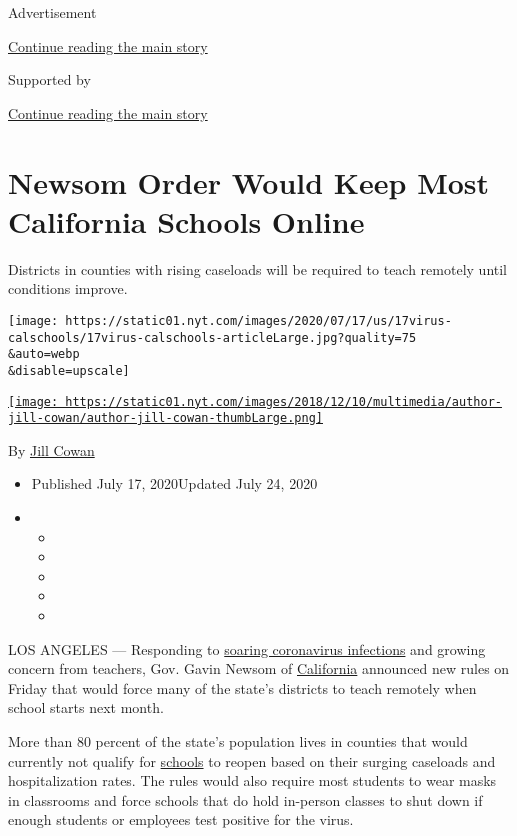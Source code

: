 Advertisement

\protect\hyperlink{after-top}{Continue reading the main story}

Supported by

\protect\hyperlink{after-sponsor}{Continue reading the main story}

\hypertarget{newsom-order-would-keep-most-california-schools-online}{%
\section{Newsom Order Would Keep Most California Schools
Online}\label{newsom-order-would-keep-most-california-schools-online}}

Districts in counties with rising caseloads will be required to teach
remotely until conditions improve.

\texttt{[image: https://static01.nyt.com/images/2020/07/17/us/17virus-calschools/17virus-calschools-articleLarge.jpg?quality=75\\\&auto=webp\\\&disable=upscale]}

\href{https://www.nytimes.com/by/jill-cowan}{\texttt{[image: https://static01.nyt.com/images/2018/12/10/multimedia/author-jill-cowan/author-jill-cowan-thumbLarge.png]}}

By \href{https://www.nytimes.com/by/jill-cowan}{Jill Cowan}

\begin{itemize}
\item
  Published July 17, 2020Updated July 24, 2020
\item
  \begin{itemize}
  \item
  \item
  \item
  \item
  \item
  \end{itemize}
\end{itemize}

LOS ANGELES --- Responding to
\href{https://www.nytimes.com/interactive/2020/us/california-coronavirus-cases.html}{soaring
coronavirus infections} and growing concern from teachers, Gov. Gavin
Newsom of
\href{https://www.nytimes.com/2020/07/24/us/ca-schools-reopening.html}{California}
announced new rules on Friday that would force many of the state's
districts to teach remotely when school starts next month.

More than 80 percent of the state's population lives in counties that
would currently not qualify for
\href{https://www.nytimes.com/2020/07/24/us/ca-schools-reopening.html}{schools}
to reopen based on their surging caseloads and hospitalization rates.
The rules would also require most students to wear masks in classrooms
and force schools that do hold in-person classes to shut down if enough
students or employees test positive for the virus.

